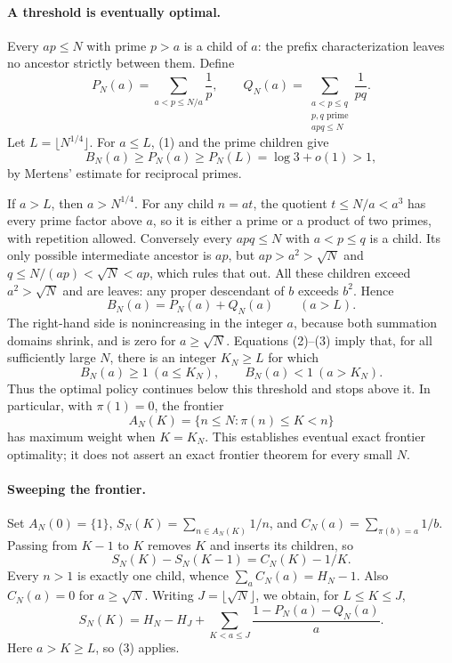 \paragraph{A threshold is eventually optimal.}
Every \(ap\leq N\) with prime \(p>a\) is a child of \(a\): the prefix characterization leaves no ancestor strictly between them. Define
\[
 P_N(a)=\sum_{a<p\leq N/a}\frac1p,
 \qquad
 Q_N(a)=\sum_{\substack{a<p\leq q\\p,q\text{ prime}\\apq\leq N}}\frac1{pq}.
\]
Let \(L=\lfloor N^{1/4}\rfloor\). For \(a\leq L\), (1) and the prime children give
\[
 B_N(a)\geq P_N(a)\geq P_N(L)=\log3+o(1)>1,
 \tag{2}
\]
by Mertens' estimate for reciprocal primes.

If \(a>L\), then \(a>N^{1/4}\). For any child \(n=at\), the quotient \(t\leq N/a<a^3\) has every prime factor above \(a\), so it is either a prime or a product of two primes, with repetition allowed. Conversely every \(apq\leq N\) with \(a<p\leq q\) is a child. Its only possible intermediate ancestor is \(ap\), but
\(ap>a^2>\sqrt N\) and \(q\leq N/(ap)<\sqrt N<ap\), which rules that out. All these children exceed \(a^2>\sqrt N\) and are leaves: any proper descendant of \(b\) exceeds \(b^2\). Hence
\[
 B_N(a)=P_N(a)+Q_N(a)\qquad(a>L). \tag{3}
\]
The right-hand side is nonincreasing in the integer \(a\), because both summation domains shrink, and is zero for \(a\geq\sqrt N\). Equations (2)--(3) imply that, for all sufficiently large \(N\), there is an integer \(K_N\geq L\) for which
\[
 B_N(a)\geq1\ (a\leq K_N),\qquad B_N(a)<1\ (a>K_N).
\]
Thus the optimal policy continues below this threshold and stops above it. In particular, with \(\pi(1)=0\), the frontier
\[
 A_N(K)=\{n\leq N:\pi(n)\leq K<n\}
\]
has maximum weight when \(K=K_N\). This establishes eventual exact frontier optimality; it does not assert an exact frontier theorem for every small \(N\).

\paragraph{Sweeping the frontier.}
Set \(A_N(0)=\{1\}\), \(S_N(K)=\sum_{n\in A_N(K)}1/n\), and
\(C_N(a)=\sum_{\pi(b)=a}1/b\). Passing from \(K-1\) to \(K\) removes \(K\) and inserts its children, so
\[
 S_N(K)-S_N(K-1)=C_N(K)-1/K.
\]
Every \(n>1\) is exactly one child, whence \(\sum_a C_N(a)=H_N-1\). Also \(C_N(a)=0\) for \(a\geq\sqrt N\). Writing \(J=\lfloor\sqrt N\rfloor\), we obtain, for \(L\leq K\leq J\),
\[
 S_N(K)=H_N-H_J+
 \sum_{K<a\leq J}\frac{1-P_N(a)-Q_N(a)}a. \tag{4}
\]
Here \(a>K\geq L\), so (3) applies.

